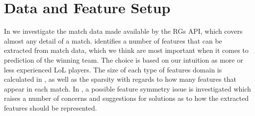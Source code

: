 \section{Data and Feature Setup}\label{sec:features}
In  we investigate the match data made available by the RGs API, which covers almost any detail of a match.
 identifies a number of features that can be extracted from match data, which we think are most important when it comes to prediction of the winning team. The choice is based on our intuition as more or less experienced LoL players. The size of each type of features domain is calculated in , as well as the sparsity with regards to how many features that appear in each match.
In , a possible feature symmetry issue is investigated which raises a number of concerns and suggestions for solutions as to how the extracted features should be represented. 


